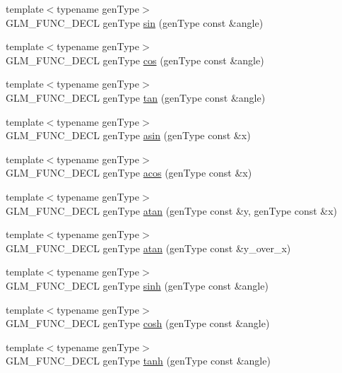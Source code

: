 \begin{CompactItemize}
\item 
{\footnotesize template$<$typename genType$>$ }\\GLM\_\-FUNC\_\-DECL genType \hyperlink{group__core__func__trigonometric_gd4d4eda735d915be9af695fe2b4cded2}{sin} (genType const \&angle)
\item 
{\footnotesize template$<$typename genType$>$ }\\GLM\_\-FUNC\_\-DECL genType \hyperlink{group__core__func__trigonometric_gfef15df90786cd24fe786cc0ff2cbc98}{cos} (genType const \&angle)
\item 
{\footnotesize template$<$typename genType$>$ }\\GLM\_\-FUNC\_\-DECL genType \hyperlink{group__core__func__trigonometric_g93a81f04757351ba92d924e237cbeb61}{tan} (genType const \&angle)
\item 
{\footnotesize template$<$typename genType$>$ }\\GLM\_\-FUNC\_\-DECL genType \hyperlink{group__core__func__trigonometric_gb87756fced3e8d3f58b24b65c8166b77}{asin} (genType const \&x)
\item 
{\footnotesize template$<$typename genType$>$ }\\GLM\_\-FUNC\_\-DECL genType \hyperlink{group__core__func__trigonometric_gd945cb7263cb202d93ea76aa5d419078}{acos} (genType const \&x)
\item 
{\footnotesize template$<$typename genType$>$ }\\GLM\_\-FUNC\_\-DECL genType \hyperlink{group__core__func__trigonometric_gb89f4e2a1ea1426dc87ab3a06901b68a}{atan} (genType const \&y, genType const \&x)
\item 
{\footnotesize template$<$typename genType$>$ }\\GLM\_\-FUNC\_\-DECL genType \hyperlink{group__core__func__trigonometric_g459eaa7149e799125acda24938114746}{atan} (genType const \&y\_\-over\_\-x)
\item 
{\footnotesize template$<$typename genType$>$ }\\GLM\_\-FUNC\_\-DECL genType \hyperlink{group__core__func__trigonometric_g925002c6a847894241278997d189429a}{sinh} (genType const \&angle)
\item 
{\footnotesize template$<$typename genType$>$ }\\GLM\_\-FUNC\_\-DECL genType \hyperlink{group__core__func__trigonometric_g522e0c2f8dbac0df60a2bf436fb88e69}{cosh} (genType const \&angle)
\item 
{\footnotesize template$<$typename genType$>$ }\\GLM\_\-FUNC\_\-DECL genType \hyperlink{group__core__func__trigonometric_gaa29bdd7f3b57755a7b6a9834d59887f}{tanh} (genType const \&angle)

\end{CompactItemize}
